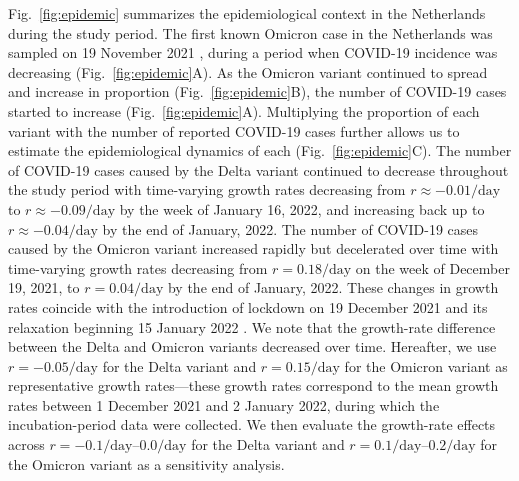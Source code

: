 \documentclass[12pt]{article}
\newcommand{\fref}[1]{Fig.~\ref{fig:#1}}
\begin{document}
\fref{epidemic} summarizes the epidemiological context in the Netherlands during the study period.
The first known Omicron case in the Netherlands was sampled on 19 November 2021 \citep{backer2021omicron}, during a period when COVID-19 incidence was decreasing (\fref{epidemic}A).
As the Omicron variant continued to spread and increase in proportion (\fref{epidemic}B), the number of COVID-19 cases started to increase (\fref{epidemic}A).
Multiplying the proportion of each variant with the number of reported COVID-19 cases further allows us to estimate the epidemiological dynamics of each (\fref{epidemic}C).
The number of COVID-19 cases caused by the Delta variant continued to decrease throughout the study period with time-varying growth rates decreasing from $r \approx -0.01/\mathrm{day}$ to $r \approx -0.09/\mathrm{day}$ by the week of January 16, 2022, and increasing back up to $r \approx -0.04/\mathrm{day}$ by the end of January, 2022.
The number of COVID-19 cases caused by the Omicron variant increased rapidly but decelerated over time with time-varying growth rates decreasing from $r=0.18/\mathrm{day}$ on the week of December 19, 2021, to $r=0.04/\mathrm{day}$ by the end of January, 2022.
These changes in growth rates coincide with the introduction of lockdown on 19 December 2021 \citep{netherlandslockdown} and its relaxation beginning 15 January 2022 \citep{netherlandsrelax,netherlandsopen}.
We note that the growth-rate difference between the Delta and Omicron variants decreased over time.
Hereafter, we use $r=-0.05/\mathrm{day}$ for the Delta variant and $r=0.15/\mathrm{day}$ for the Omicron variant as representative growth rates---these growth rates correspond to the mean growth rates between 1 December 2021 and 2 January 2022, during which the incubation-period data were collected.
We then evaluate the growth-rate effects across $r=-0.1/\mathrm{day}$--$0.0/\mathrm{day}$ for the Delta variant and $r=0.1/\mathrm{day}$--$0.2/\mathrm{day}$ for the Omicron variant as a sensitivity analysis.
\end{document}

